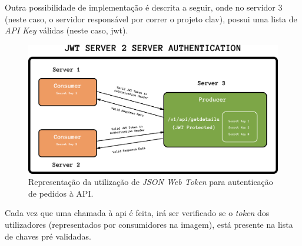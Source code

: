 Outra possibilidade de implementação é descrita a seguir, onde no servidor 3 (neste caso, o servidor responsável por correr o projeto \gls{clav}), possui uma lista de \emph{API Key} válidas (neste caso, \gls{jwt}).

\begin{figure}[h]
    \centering
    \includegraphics[width=\textwidth]{img/jwt/jwtAPI.png}
    \caption{Representação da utilização de \emph{JSON Web Token} para autenticação de pedidos à API. \cite{jwtAPI}}
\end{figure}

Cada vez que uma chamada à \gls{api} é feita, irá ser verificado se o \emph{token} dos utilizadores (representados por consumidores na imagem), está presente na lista de chaves pré validadas.